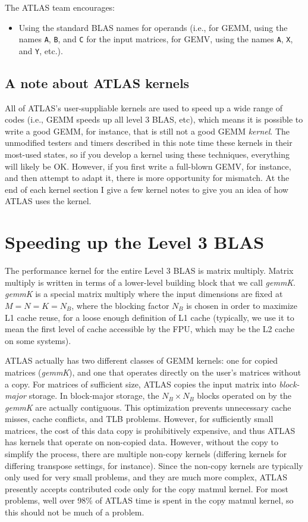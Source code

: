 \documentclass[11pt]{article}
\begin{document}
The ATLAS team encourages:
\begin{itemize}
\item Using the standard BLAS names for operands (i.e., for GEMM, using
the names {\tt A}, {\tt B}, and {\tt C} for the input matrices, for
GEMV, using the names {\tt A}, {\tt X}, and {\tt Y}, etc.).
\end{itemize}


\subsection{A note about ATLAS kernels}
All of ATLAS's user-suppliable kernels are used to speed up a wide range
of codes (i.e., GEMM speeds up all level 3 BLAS, etc), which means it is
possible to write a good GEMM, for instance, that is still not a good
GEMM {\em kernel}.  The unmodified testers and timers described in this
note time these kernels in their most-used states, so if you develop a
kernel using these techniques, everything will likely be OK.  However,
if you first write a full-blown GEMV, for instance, and then attempt
to adapt it, there is more opportunity for mismatch.  At the end of
each kernel section I give a few kernel notes to give you an idea of
how ATLAS uses the kernel.

\section{Speeding up the Level 3 BLAS}

The performance kernel for the entire Level 3 BLAS is matrix multiply.
Matrix multiply is written in terms of a lower-level building block that
we call {\it gemmK}.  {\it gemmK} is a special matrix multiply where
the input dimensions are fixed at $M = N = K = N_B$, where the blocking
factor $N_B$ is chosen in order to maximize L1 cache reuse, for a loose
enough definition of L1 cache (typically, we use it to mean the first 
level of cache accessible by the FPU, which may be the L2 cache on
some systems).

ATLAS actually has two different classes of GEMM kernels: one for copied
matrices ({\it gemmK}), and one that operates directly on the user's matrices
without a copy.  For matrices of
sufficient size, ATLAS copies the input matrix into {\em block-major} storage.
In block-major storage, the $N_B \times N_B$ blocks operated on by the
{\it gemmK} are actually contiguous.  This optimization prevents unnecessary
cache misses, cache conflicts, and TLB problems.  However, for sufficiently
small matrices, the cost of this data copy is prohibitively expensive,
and thus ATLAS has kernels that operate on non-copied data.  However,
without the copy to simplify the process, there are multiple non-copy
kernels (differing kernels for differing transpose settings, for instance).
Since the non-copy kernels are typically only used for very small problems,
and they are much more complex, ATLAS presently accepts contributed code
only for the copy matmul kernel.  For most problems, well over 98\% of ATLAS
time is spent in the copy matmul kernel, so this should not be much of 
a problem.
\end{document}
